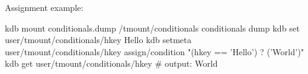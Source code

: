 Assignment example\+: \begin{DoxyVerb}    kdb mount conditionals.dump /tmount/conditionals conditionals dump
    kdb set user/tmount/conditionals/hkey Hello
    kdb setmeta user/tmount/conditionals/hkey assign/condition "(hkey == 'Hello') ? ('World')"
    kdb get user/tmount/conditionals/hkey # output: World\end{DoxyVerb}
 